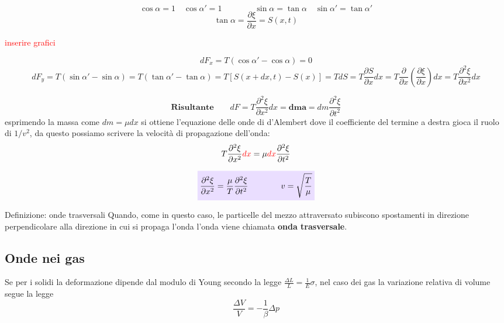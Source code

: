 \documentclass[x11names]{article}
\newcommand{\viola}[1]{\colorbox{myred}{$\displaystyle #1$}}
\begin{document}
	\[ 
	\cos{\alpha} = 1 \quad \cos{\alpha'} = 1 \qquad \qquad \sin{\alpha} = \tan{\alpha} \quad \sin{\alpha'} = \tan{\alpha'}
	\]
	\[ 
	\boxed{\tan\alpha = \frac{\partial \xi}{\partial x} = S(x,t)}
	\]
	
	\begin{center}
		\textcolor{red}{inserire grafici}
	\end{center}
	
	
	\[ 
	dF_x = T(\cos\alpha' - \cos\alpha ) = 0 
	\]
	\[ 
	 dF_y = T(\sin\alpha' - \sin\alpha ) = T(\tan\alpha' - \tan\alpha ) = T\left[S(x+dx,t) - S(x)\right] = TdS = T\frac{\partial S}{\partial x}dx = T\frac{\partial}{\partial x}\left(\frac{\partial \xi}{\partial x}\right)dx = T\frac{\partial^2 \xi}{\partial x^2}dx
	\]
	
	\[ 
	\textbf{Risultante} \qquad	dF =  T\frac{\partial^2 \xi}{\partial x^2}dx  \mathbf{= dm a} = dm \frac{\partial^2 \xi}{\partial t^2} 
	\]
	esprimendo la massa come \(dm = \mu dx\) si ottiene l'equazione delle onde di d'Alembert dove il coefficiente del termine a destra gioca il ruolo di \(1/v^2\), da questo possiamo scrivere la velocità di propagazione dell'onda:
	\[ 
	T\frac{\partial^2\xi}{\partial x^2}\textcolor{red}{dx} = \mu \textcolor{red}{dx} \frac{\partial^2 \xi}{\partial t^2}
	\]

	\begin{equation}\label{corda}
		\viola{	\frac{\partial^2\xi}{\partial x^2} = \frac{\mu}{T} \frac{\partial^2 \xi}{\partial t^2} \qquad \qquad v = \sqrt{\frac{T}{\mu}}}
	\end{equation}
	
	\begin{center}
		\colorbox{myblue}{\begin{minipage}{5.75in}
				\begin{blues}{Definizione: onde trasversali}
					Quando, come in questo caso, le particelle del mezzo attraversato subiscono spostamenti in direzione perpendicolare alla direzione in cui si propaga l'onda l'onda viene chiamata \textbf{onda trasversale}.
				\end{blues}
		\end{minipage}}
	\end{center}
	
\newpage
\subsection{Onde nei gas}
	Se per i solidi la deformazione dipende dal modulo di Young secondo la legge \(\frac{\Delta L}{L} = \frac{1}{E}\sigma\), nel caso dei gas la variazione relativa di volume segue la legge
	\[ 
	\frac{\Delta V}{V} = -\frac{1}{\beta} \Delta p
	\] \\
	
\end{document}
